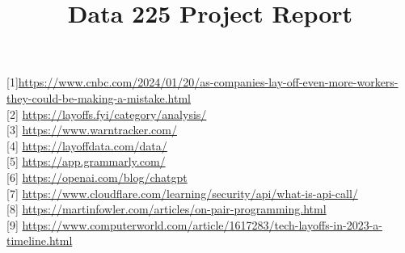 \documentclass[12pt,oneside,letterpaper,english]{article}
\title{Data 225 Project Report} %
\begin{document}


\newpage
\doublespacing
\renewcommand{\baselinestretch}{1}\normalsize
\tableofcontents
\renewcommand{\baselinestretch}{1}\normalsize
\thispagestyle{fancy} %

\newpage
{} 


 

\label{EndOfText}

\newpage
{}
 

{[1]\href{https://www.cnbc.com/2024/01/20/as-companies-lay-off-even-more-workers-they-could-be-making-a-mistake.html}{https://www.cnbc.com/2024/01/20/as-companies-lay-off-even-more-workers-they-could-be-making-a-mistake.html}}\\
{[2] \href{https://layoffs.fyi/category/analysis/}{https://layoffs.fyi/category/analysis/}}\\
{[3] \href{https://www.warntracker.com/}{https://www.warntracker.com/}}\\
{[4] \href{https://layoffdata.com/data/}{https://layoffdata.com/data/}}\\
{[5] \href{https://app.grammarly.com/}{https://app.grammarly.com/}}\\
{[6] \href{https://openai.com/blog/chatgpt}{https://openai.com/blog/chatgpt}}\\
{[7] \href{https://www.cloudflare.com/learning/security/api/what-is-api-call/}{https://www.cloudflare.com/learning/security/api/what-is-api-call/}}\\
{[8] \href{https://martinfowler.com/articles/on-pair-programming.html}{https://martinfowler.com/articles/on-pair-programming.html}}\\
{[9] \href{https://www.computerworld.com/article/1617283/tech-layoffs-in-2023-a-timeline.html}{https://www.computerworld.com/article/1617283/tech-layoffs-in-2023-a-timeline.html}}\\


\label{endOfDoc}
\end{document}
